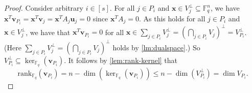\documentclass[11pt]{article}
\theoremstyle{plain}
\theoremstyle{definition}
\theoremstyle{remark}
\newcommand{\F}{\mathbb{F}}
\newcommand{\bv}{\bm{v}}
\newcommand{\bu}{\bm{u}}
\newcommand{\bx}{\bm{x}}
\newcommand{\rank}{\mathrm{rank}}
\begin{document}
\begin{proof}
Consider arbitrary $i\in [s]$. For all $j\in P_i$ and $\bx\in V_j^{\perp}\subseteq \F_q^n$, we have $\bx^T \bv_{P_i}=\bx^T \bv_j=\bx^T A_j \bu_j=0$ since $\bx^T A_j=0$.
As this holds for all $j\in P_i$ and $\bx\in V_j^{\perp}$, we have that $\bx^T \bv_{P_i}=0$ for all $\bx\in \sum_{j\in P_i} V_j^{\perp}=\left(\bigcap_{j\in P_i} V_j\right)^{\perp}=V_{P_i}^{\perp}$. (Here $\sum_{j\in P_i} V_j^{\perp}=\left(\bigcap_{j\in P_i} V_j\right)^{\perp }$ holds by \cref{lm:dualspace}.)
So $V_{P_i}^{\perp}\subseteq \ker_{\F_q}(\bv_{P_i})$.
It follows by \cref{lem:rank-kernel} that 
\begin{equation}\label{eq:rank-bound-0}
\rank_{\F_q}(\bv_{P_i})=n-\dim(\ker_{\F_q}(\bv_{P_i}))\leq n-\dim\left(V_{P_i}^{\perp}\right)=\dim V_{P_i}.
\end{equation}


 

\end{proof}
\end{document}
